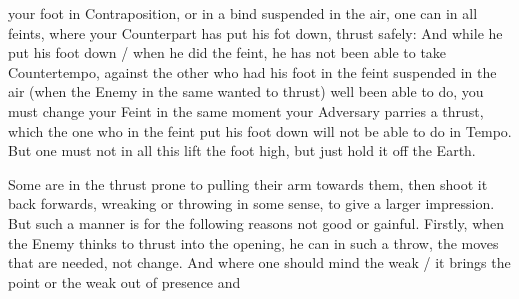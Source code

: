 your foot in Contraposition, or in a bind suspended in the air, one
can in all feints, where your Counterpart has put his fot down, thrust safely:
And while he put his foot down / when he did the feint, he has not
been able to take Countertempo, against the other who had his foot in
the feint suspended in the air (when the Enemy in the same wanted to
thrust) well been able to do, you must change your Feint in the same moment
your Adversary parries a thrust, which the one who in the feint put his
foot down will not be able to do in Tempo. But one must not in all
this lift the foot high, but just hold it off the Earth.




Some are in the thrust prone to pulling their arm towards them, then
shoot it back forwards, wreaking or throwing in some sense, to give a
larger impression. But such a manner is for the following reasons not
good or gainful. Firstly, when the Enemy thinks to thrust into the
opening, he can in such a throw, the moves that are needed, not
change. And where one should mind the weak / it brings the point or
the weak out of presence and
